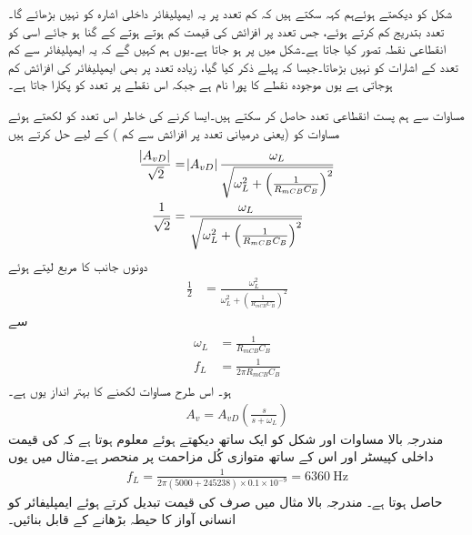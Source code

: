 شکل کو دیکھتے ہوئےہم کہہ سکتے ہیں کہ کم تعدد پر یہ ایمپلیفائر داخلی اشارہ کو نہیں بڑھائے گا۔تعدد بتدریج کم کرتے ہوئے، جس تعدد پر افزائش کی قیمت کم ہوتے ہوتے  کے  گنا ہو جائے اسی کو انقطاعی نقطہ  تصور کیا جاتا ہے۔شکل   میں  پر  ہو جاتا ہے۔یوں ہم کہیں گے کہ یہ ایمپلیفائر   سے کم تعدد کے اشارات کو نہیں بڑھاتا۔جیسا کہ پہلے ذکر کیا گیا، زیادہ تعدد پر بھی ایمپلیفائر کی افزائش کم ہوجاتی ہے یوں موجودہ نقطے کا پورا نام  ہے جبکہ اس نقطے پر تعدد  کو   پکارا جاتا ہے۔


مساوات  سے ہم پست انقطاعی تعدد حاصل کر سکتے ہیں۔ایسا کرنے کی خاطر اس تعدد کو  لکھتے ہوئے مساوات کو  (یعنی درمیانی تعدد پر افزائش سے   کم ) کے لیے حل کرتے ہیں
\begin{align*}
\frac{\abs{A_{vD}}}{\sqrt{2}} &=\abs{A_{vD}} \frac{\omega_L}{\sqrt{\omega_L^2 +\left(\frac{1}{R_{mCB} C_B} \right )^2}}\\
\frac{1}{\sqrt{2}}&= \frac{\omega_L}{\sqrt{\omega_L^2 +\left(\frac{1}{R_{mCB} C_B} \right )^2}}
\end{align*}
دونوں جانب کا مربع لیتے ہوئے
\begin{align*}
\frac{1}{2}&= \frac{\omega_L^2}{\omega_L^2 +\left(\frac{1}{R_{mCB} C_B} \right )^2}
\end{align*}
سے
\begin{gather} \label{مساوات_تعددی_ردعمل_قابو_کپیسٹر_پست_انقطاعی_تعدد}
\begin{aligned}
\omega_L &= \frac{1}{R_{mCB} C_B}\\
f_L&=\frac{1}{2 \pi  R_{mCB} C_B}
\end{aligned}
\end{gather}
ہو۔ اس طرح مساوات   لکھنے کا بہتر انداز یوں ہے۔
\begin{align} \label{مساوات_تعددی_ردعمل_قابو_کپیسٹر_معیاری_مساوات}
A_v=A_{vD} \left(\frac{s}{s+\omega_L} \right )
\end{align}
مندرجہ بالا مساوات اور شکل   کو ایک ساتھ دیکھتے ہوئے معلوم ہوتا ہے کہ   کی قیمت داخلی کپیسٹر   اور اس کے ساتھ متوازی کُل مزاحمت   پر منحصر ہے۔مثال   میں یوں
\begin{align*}
f_L=\frac{1}{2 \pi \left(5000+245238 \right ) \times 0.1 \times 10^{-9}  }=\SI{6360}{\hertz}
\end{align*}
حاصل ہوتا ہے۔
مندرجہ بالا مثال  میں صرف کی قیمت تبدیل کرتے ہوئے ایمپلیفائر کو انسانی آواز کا حیطہ بڑھانے کے قابل بنائیں۔

